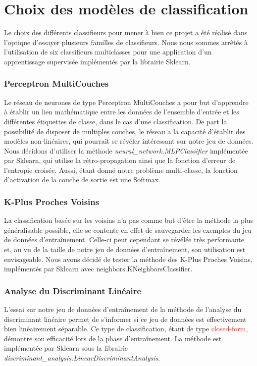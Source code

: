 \section{Choix des modèles de classification}
Le choix des différents classifieurs pour mener à bien ce projet a été réalisé dans l'optique d'essayer plusieurs familles de classifieurs. Nous nous sommes arrêtés à l'utilisation de six classifieurs multiclasses pour une application d'un apprentissage supervisée implémentés par la librairie Sklearn.

\subsubsection*{Perceptron MultiCouches}
Le réseau de neurones de type Perceptron MultiCouches a pour but d'apprendre à établir un lien mathématique entre les données de l'ensemble d'entrée et les différentes étiquettes de classe, dans le cas d'une classification. De part la possibilité de disposer de multiples couches, le réseau a la capacité d'établir des modèles non-linéaires, qui pourrait se révéler intéressant sur notre jeu de données. Nous décidons d'utiliser la méthode \emph{neural\_network.MLPClassifier} implémentée par Sklearn, qui utilise la rétro-propagation ainsi que la fonction d'erreur de l'entropie croisée. Aussi, étant donné notre problème multi-classe, la fonction d'activation de la couche de sortie est une Softmax.

\subsubsection*{K-Plus Proches Voisins}
La classification basée sur les voisins n'a pas comme but d'être la méthode la plus généralisable possible, elle se contente en effet de sauvegarder les exemples du jeu de données d'entraînement. Celle-ci peut cependant se révélée très performante et, au vu de la taille de notre jeu de données d'entraînement, son utilisation est envisageable.
Nous avons décidé de tester la méthode des K-Plus Proches Voisins, implémentés par Sklearn avec neighbors.KNeighborsClassifier.

\subsubsection*{Analyse du Discriminant Linéaire}
L'essai sur notre jeu de données d'entraînement de la méthode de l'analyse du discriminant linéaire permet de s'informer si ce jeu de données est effectivement bien linéairement séparable. Ce type de classification, étant de type \textcolor{red}{closed-form}, démontre son efficacité lors de la phase d'entraînement. La méthode est implémentée par Sklearn sous la librairie \emph{discriminant\_analysis.LinearDiscriminantAnalysis}.

